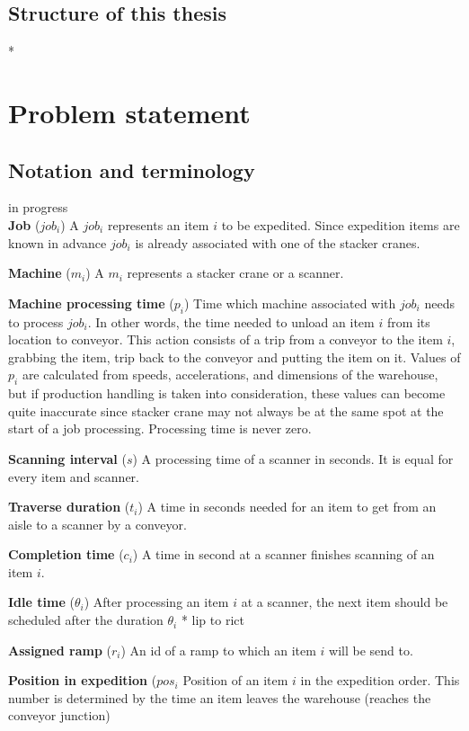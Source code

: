 \documentclass{ctuthesis}
\begin{document}
\section{Structure of this thesis}
*


\chapter{Problem statement}

\section{Notation and terminology}
in progress\\
\noindent \textbf{Job} ($job_i$) A $job_i$ represents an item $i$ to be expedited. Since expedition items are known in advance $job_i$ is already associated with one of the stacker cranes. 

\noindent \textbf{Machine} ($m_i$) A $m_i$ represents a stacker crane or a scanner. 

\noindent \textbf{Machine processing time} ($p_i$) Time which machine associated with $job_i$ needs to process $job_i$. In other words, the time needed to unload an item $i$ from its location to conveyor. This action consists of a trip from a conveyor to the item $i$, grabbing the item, trip back to the conveyor and putting the item on it. Values of $p_i$ are calculated from speeds, accelerations, and dimensions of the warehouse, but if production handling is taken into consideration, these values can become quite inaccurate since stacker crane may not always be at the same spot at the start of a job processing. Processing time is never zero.


\noindent \textbf{Scanning interval} ($s$) A processing time of a scanner in seconds. It is equal for every item and scanner.

\noindent \textbf{Traverse duration} ($t_i$) A time in seconds needed for an item to get from an aisle to a scanner by a conveyor.

\noindent \textbf{Completion time} ($c_i$) A time in second at a scanner finishes scanning of an item $i$.

\noindent \textbf{Idle time} ($\theta_i$) After processing an item $i$ at a scanner, the next item should be scheduled after the duration $\theta_i$ * lip to rict

\noindent \textbf{Assigned ramp} ($r_i$) An id of a ramp to which an item $i$ will be send to.

\noindent \textbf{Position in expedition} ($pos_i$ Position of an item $i$ in the expedition order. This number is determined by the time an item leaves the warehouse (reaches the conveyor junction)
\end{document}
